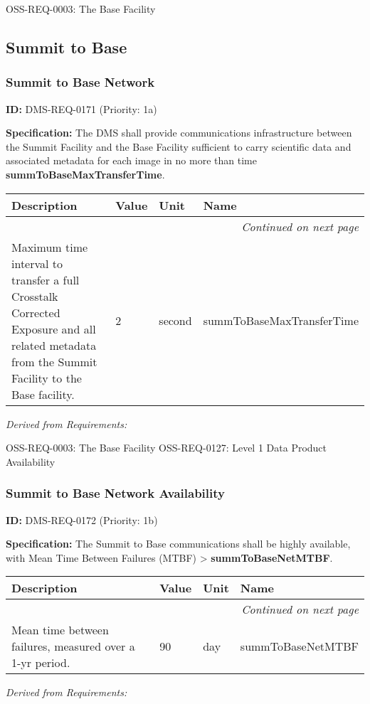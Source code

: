 \documentclass[SE,toc,lsstdraft]{lsstdoc}
\makeatletter
\newcommand{\paramname}[1]{\hspace{0pt}#1}
\newcommand{\unitname}[1]{\hspace{0pt}#1}
\newenvironment{parameters}[0]{%
\setlength\LTleft{0pt}
\setlength\LTright{\fill}
\begin{small}
\begin{longtable}[]{|p{0.49\textwidth}|l|p{0.6in}|p{1.70in}@{}|}

\hline \textbf{Description} & \textbf{Value} & \textbf{Unit} & \textbf{Name} \\ \hline
\endhead

\hline \multicolumn{4}{r}{\emph{Continued on next page}} \\
\endfoot

\hline\hline
\endlastfoot
}{%
\hline
\end{longtable}
\end{small}
}
\makeatother
\begin{document}
OSS-REQ-0003:
The Base Facility \newline

\subsection{Summit to Base}

\subsubsection{Summit to Base Network}

\label{DMS-REQ-0171}
\textbf{ID:} DMS-REQ-0171 (Priority: 1a)

\textbf{Specification:} The DMS shall provide communications infrastructure between the Summit Facility and the Base Facility sufficient to carry scientific data and associated metadata for each image in no more than time \textbf{summToBaseMaxTransferTime}.

\begin{parameters}
Maximum time interval to transfer a full Crosstalk Corrected Exposure and all related metadata from the Summit Facility to the Base facility.
&
2
&
\unitname{%
second
}
&
\paramname{%
summToBaseMaxTransferTime
} \\\hline
\end{parameters}

\emph{Derived from Requirements:}

OSS-REQ-0003:
The Base Facility \newline
OSS-REQ-0127:
Level 1 Data Product Availability \newline

\subsubsection{Summit to Base Network Availability}

\label{DMS-REQ-0172}
\textbf{ID:} DMS-REQ-0172 (Priority: 1b)

\textbf{Specification:} The Summit to Base communications shall be highly available, with Mean Time Between Failures (MTBF) > \textbf{summToBaseNetMTBF}.

\begin{parameters}
Mean time between failures, measured over a 1-yr period.
&
90
&
\unitname{%
day
}
&
\paramname{%
summToBaseNetMTBF
} \\\hline
\end{parameters}

\emph{Derived from Requirements:}
\end{document}

